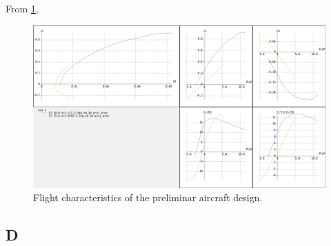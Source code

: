 From \ref{fig:craftpolar}, 	

\begin{figure}
\centering
  \includegraphics[width=\linewidth]{figs/craftpolar.png}
  \caption{Flight characteristics of the preliminar aircraft design.}
  \label{fig:craftpolar}
\end{figure}


\subsection{D}



